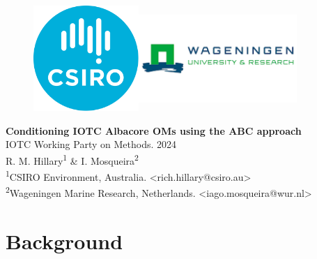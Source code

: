 \documentclass[11pt]{article}
\begin{document}

\begin{figure}[ht]
\centering  \includegraphics[width=4cm,height=4cm]{CSIRO.png}\hfill\includegraphics[width=6cm,height=4cm]{UWag.png}
\end{figure}

\vspace{0.5in}
\begin{center}
{\Large\textbf{Conditioning IOTC Albacore OMs using the
ABC approach}}\\
\vspace*{0.5in}
{IOTC Working Party on Methods. 2024}\\
\vspace*{0.5in}
    R. M. Hillary\textsuperscript{1} \& I. Mosqueira\textsuperscript{2}\\
    \vspace{0.5in}
\textsuperscript{1}CSIRO Environment, Australia. <rich.hillary@csiro.au>\\
\textsuperscript{2}Wageningen Marine Research, Netherlands. <iago.mosqueira@wur.nl>
\end{center}

\newpage
\section{Background}
\end{document}
